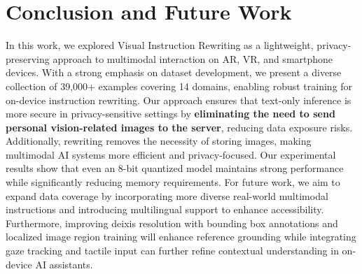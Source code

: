 \section{Conclusion and Future Work}
\label{sec:conclusion}
In this work, we explored Visual Instruction Rewriting as a lightweight, privacy-preserving approach to multimodal interaction on AR, VR, and smartphone devices. With a strong emphasis on dataset development, we present a diverse collection of 39,000+ examples covering 14 domains, enabling robust training for on-device instruction rewriting. Our approach ensures that text-only inference is more secure in privacy-sensitive settings by \textbf{eliminating the need to send personal vision-related images to the server}, reducing data exposure risks. Additionally, rewriting removes the necessity of storing images, making multimodal AI systems more efficient and privacy-focused. Our experimental results show that even an 8-bit quantized model maintains strong performance while significantly reducing memory requirements. For future work, we aim to expand data coverage by incorporating more diverse real-world multimodal instructions and introducing multilingual support to enhance accessibility. Furthermore, improving deixis resolution with bounding box annotations and localized image region training will enhance reference grounding while integrating gaze tracking and tactile input can further refine contextual understanding in on-device AI assistants.